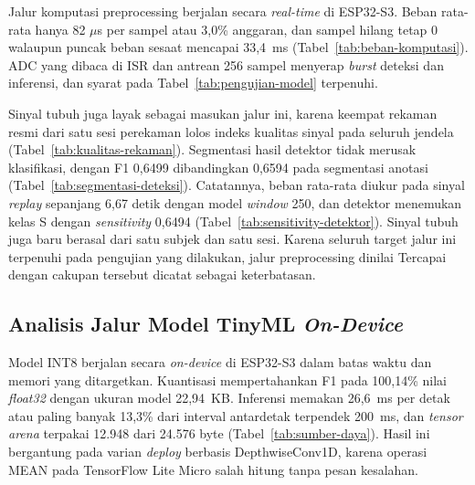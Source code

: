 Jalur komputasi preprocessing berjalan secara \textit{real-time} di ESP32-S3. Beban rata-rata hanya 82 $\mu$s per sampel atau 3,0\% anggaran, dan sampel hilang tetap 0 walaupun puncak beban sesaat mencapai 33,4~ms (Tabel~\ref{tab:beban-komputasi}). ADC yang dibaca di ISR dan antrean 256 sampel menyerap \textit{burst} deteksi dan inferensi, dan syarat pada Tabel~\ref{tab:pengujian-model} terpenuhi.

Sinyal tubuh juga layak sebagai masukan jalur ini, karena keempat rekaman resmi dari satu sesi perekaman lolos indeks kualitas sinyal pada seluruh jendela (Tabel~\ref{tab:kualitas-rekaman}). Segmentasi hasil detektor tidak merusak klasifikasi, dengan F1 0,6499 dibandingkan 0,6594 pada segmentasi anotasi (Tabel~\ref{tab:segmentasi-deteksi}). Catatannya, beban rata-rata diukur pada sinyal \textit{replay} sepanjang 6,67 detik dengan model \textit{window} 250, dan detektor menemukan kelas S dengan \textit{sensitivity} 0,6494 (Tabel~\ref{tab:sensitivity-detektor}). Sinyal tubuh juga baru berasal dari satu subjek dan satu sesi. Karena seluruh target jalur ini terpenuhi pada pengujian yang dilakukan, jalur preprocessing dinilai Tercapai dengan cakupan tersebut dicatat sebagai keterbatasan.

\subsection{Analisis Jalur Model TinyML \textit{On-Device}}

Model INT8 berjalan secara \textit{on-device} di ESP32-S3 dalam batas waktu dan memori yang ditargetkan. Kuantisasi mempertahankan F1 pada 100,14\% nilai \textit{float32} dengan ukuran model 22,94~KB. Inferensi memakan 26,6~ms per detak atau paling banyak 13,3\% dari interval antardetak terpendek 200~ms, dan \textit{tensor arena} terpakai 12.948 dari 24.576 byte (Tabel~\ref{tab:sumber-daya}). Hasil ini bergantung pada varian \textit{deploy} berbasis DepthwiseConv1D, karena operasi MEAN pada TensorFlow Lite Micro salah hitung tanpa pesan kesalahan.

